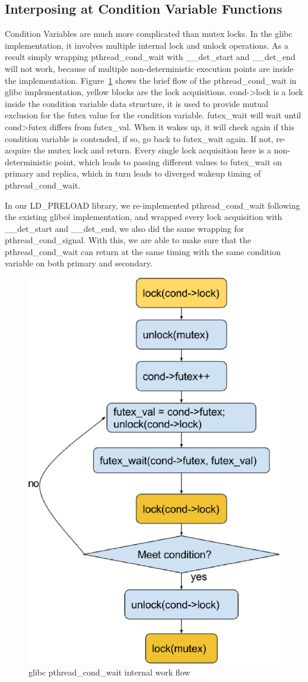 \subsection{Interposing at Condition Variable Functions}

Condition Variables are much more complicated than mutex locks. In the glibc implementation, it involves multiple internal lock and unlock operations. As a result simply wrapping pthread\_cond\_wait with \_\_det\_start and \_\_det\_end will not work, because of multiple non-deterministic execution points are inside the implementation. Figure~\ref{f:cond_wait} shows the brief flow of the pthread\_cond\_wait in glibc implementation, yellow blocks are the lock acquisitions. cond->lock is a lock inside the condition variable  data structure, it is used to provide mutual exclusion for the futex value for the condition variable. futex\_wait will wait until cond\->futex differs from futex\_val. When it wakes up, it will check again if this condition variable is contended, if so, go back to futex\_wait again. If not, re-acquire the mutex lock and return. Every single lock acquisition here is a non-deterministic point, which leads to passing different values to futex\_wait on primary and replica, which in turn leads to diverged wakeup timing of pthread\_cond\_wait.

\newpage

In our LD\_PRELOAD library, we re-implemented pthread\_cond\_wait following the existing glibc\'s implementation, and wrapped every lock acquisition with \_\_det\_start and \_\_det\_end, we also did the same wrapping for pthread\_cond\_signal. With this, we are able to make sure that the pthread\_cond\_wait can return at the same timing with the same condition variable on both primary and secondary.


\begin{figure}
\centering
\includegraphics[width=0.4\columnwidth]{figures/cond_wait}
\caption{glibc pthread\_cond\_wait internal work flow}
\label{f:cond_wait}
\end{figure}

